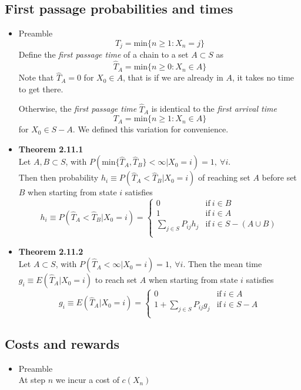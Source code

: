 \documentclass[11pt,a4paper]{article}
\begin{document}
\subsection{First passage probabilities and times}
\begin{itemize}
	\item Preamble \\
		$$T_j = \text{min}\{n \geq 1 : X_n = j\}$$
		Define the \emph{first passage time} of a chain to a set $A \subset S$ as
		$$\widehat{T}_A = \text{min} \{n \geq 0 : X_n \in A \}$$
		Note that $\widehat{T}_A = 0$ for $X_0 \in A$,
		that is if we are already in $A$, it takes no time to get there.

		Otherwise, the \emph{first passage time} $\widehat{T}_A$ is identical to the \emph{first arrival time}
		$$T_A = \text{min} \{n \geq 1 : X_n \in A\}$$
		for $X_0 \in S - A$.
		We defined this variation for convenience.
	\item \textbf{Theorem 2.11.1} \\
		Let $A, B \subset S$, with $P(\text{min}\{\widehat{T}_A,\widehat{T}_B\} < \infty | X_0 = i) = 1, \ \forall i$. \\
		Then then probability
		$h_i \equiv P(\widehat{T}_A < \widehat{T}_B | X_0 = i)$
		of reaching set $A$ before set $B$ when starting from state $i$ satisfies
		\[
			h_i \equiv P(\widehat{T}_A < \widehat{T}_B | X_0 = i) =
			\begin{cases}{}
				0 & \text{if} \ i \in B \\
				1 & \text{if} \ i \in A \\
				\sum_{j \in S} P_{ij}h_j & \text{if} \ i \in S - (A \cup B) \\
			\end{cases}
		\]
	\item \textbf{Theorem 2.11.2} \\
		Let $A \subset S$, with $P(\widehat{T}_A < \infty | X_0 = i) = 1, \ \forall i$.
		Then the mean time $g_i \equiv E(\widehat{T}_A | X_0 = i)$
		to reach set $A$ when starting from state $i$ satisfies
	\[
		g_i \equiv E(\widehat{T}_A | X_0 = i) =
		\begin{cases}{}
			0 & \text{if} \ i \in A \\
			1 + \sum_{j \in S} P_{ij}g_j & \text{if} \ i \in S - A \\
		\end{cases}
	\]
\end{itemize}

\subsection{Costs and rewards}
\begin{itemize}
	\item Preamble \\
		At step $n$ we incur a cost of $c(X_n)$
\end{itemize}
\end{document}
